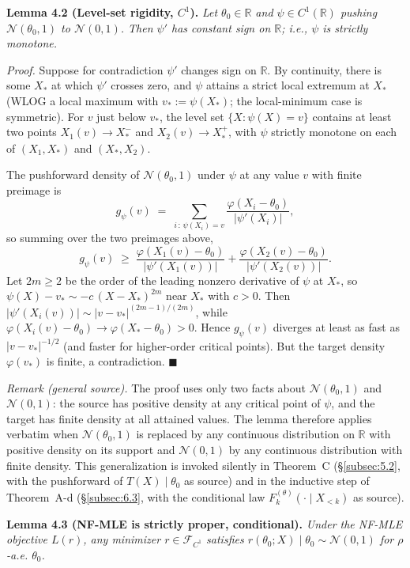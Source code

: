 \documentclass[11pt]{article}
\begin{document}
\textbf{Lemma 4.2 (Level-set rigidity, \(C^1\)).} \emph{Let
\(\theta_0 \in \mathbb{R}\) and \(\psi \in C^1(\mathbb{R})\) pushing
\(\mathcal{N}(\theta_0, 1)\) to \(\mathcal{N}(0,1)\). Then \(\psi'\) has
constant sign on \(\mathbb{R}\); i.e., \(\psi\) is strictly monotone.}

\emph{Proof.} Suppose for contradiction \(\psi'\) changes sign on
\(\mathbb{R}\). By continuity, there is some \(X_*\) at which \(\psi'\)
crosses zero, and \(\psi\) attains a strict local extremum at \(X_*\)
(WLOG a local maximum with \(v_* := \psi(X_*)\); the local-minimum case
is symmetric). For \(v\) just below \(v_*\), the level set
\(\{X : \psi(X) = v\}\) contains at least two points \(X_1(v) \to X_*^-\)
and \(X_2(v) \to X_*^+\), with \(\psi\) strictly monotone on each of
\((X_1, X_*)\) and \((X_*, X_2)\).

The pushforward density of \(\mathcal{N}(\theta_0, 1)\) under \(\psi\)
at any value \(v\) with finite preimage is
\[
g_\psi(v) \;=\; \sum_{i\,:\,\psi(X_i)=v} \frac{\varphi(X_i - \theta_0)}{|\psi'(X_i)|},
\]
so summing over the two preimages above,
\[
g_\psi(v) \;\geq\; \frac{\varphi(X_1(v) - \theta_0)}{|\psi'(X_1(v))|} + \frac{\varphi(X_2(v) - \theta_0)}{|\psi'(X_2(v))|}.
\]
Let \(2m \ge 2\) be the order of the leading nonzero derivative of
\(\psi\) at \(X_*\), so \(\psi(X) - v_* \sim -c\,(X - X_*)^{2m}\) near
\(X_*\) with \(c > 0\). Then
\(|\psi'(X_i(v))| \sim |v - v_*|^{(2m-1)/(2m)}\), while
\(\varphi(X_i(v) - \theta_0) \to \varphi(X_* - \theta_0) > 0\). Hence
\(g_\psi(v)\) diverges at least as fast as \(|v - v_*|^{-1/2}\) (and
faster for higher-order critical points). But the target density
\(\varphi(v_*)\) is finite, a contradiction. \(\blacksquare\)

\emph{Remark (general source).} The proof uses only two facts about
\(\mathcal{N}(\theta_0, 1)\) and \(\mathcal{N}(0,1)\): the source has
positive density at any critical point of \(\psi\), and the target has
finite density at all attained values. The lemma therefore applies
verbatim when \(\mathcal{N}(\theta_0, 1)\) is replaced by any continuous
distribution on \(\mathbb{R}\) with positive density on its support and
\(\mathcal{N}(0,1)\) by any continuous distribution with finite density.
This generalization is invoked silently in Theorem~C (\S\ref{subsec:5.2}, with the
pushforward of \(T(X) \mid \theta_0\) as source) and in the inductive
step of Theorem~A-d (\S\ref{subsec:6.3}, with the conditional law
\(F_k^{(\theta)}(\cdot \mid X_{<k})\) as source).

\textbf{Lemma 4.3 (NF-MLE is strictly proper, conditional).} \emph{Under
the NF-MLE objective \(L(r)\), any minimizer \(r \in \mathcal{F}_{C^1}\)
satisfies \(r(\theta_0; X) \mid \theta_0 \sim \mathcal{N}(0,1)\) for
\(\rho\)-a.e. \(\theta_0\).}
\end{document}
